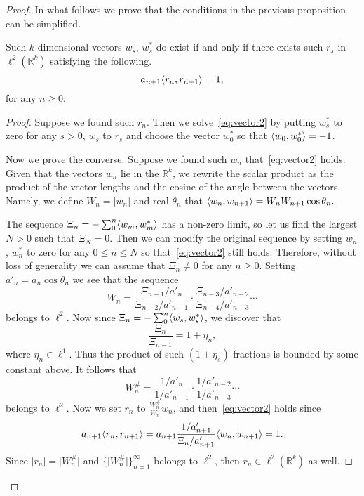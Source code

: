 \begin{proof}
    In what follows we prove that the conditions in the previous proposition can be simplified.
    \begin{prop}
      \label{prop:reformulation-lw}
      Such $k$-dimensional vectors $w_s$, $w^*_s$ do exist if and only if there exists such $r_s$ in $\ell^2(\mathbb{R}^k)$
        satisfying the following.
      \begin{equation}
        \label{eq:vector3}
        a_{n+1} \langle r_n, r_{n+1} \rangle = 1,
      \end{equation}
      for any $n \geq 0$.
    \end{prop}
    \begin{proof}
      Suppose we found such $r_n$.
      Then we solve~\eqref{eq:vector2} by putting $w^*_s$ to zero for any $s > 0$, $w_s$ to $r_s$ and
        choose the vector $w^*_0$ so that $\langle w_0, w^*_0 \rangle = -1$.

      Now we prove the converse.
      Suppose we found such $w_n$ that~\eqref{eq:vector2} holds.
      Given that the vectors $w_n$ lie in the $\mathbb{R}^k$, we rewrite the scalar product as
        the product of the vector lengths and the cosine of the angle between the vectors.
      Namely, we define $W_n = \lvert w_n\rvert$ and real $\theta_n$ that
        $\langle w_{n}, w_{n+1} \rangle = W_n W_{n+1} \cos{\theta_n}.$

      The sequence $\Xi_n = -\sum_0^n \langle w_m, w^*_m \rangle$ has a non-zero limit, so let us
        find the largest $N > 0$ such that $\Xi_N = 0$.
      Then we can modify the original sequence by setting $w_n$, $w^*_n$ to zero for any $0 \leq n \leq N$ so that~\eqref{eq:vector2}
        still holds.
      Therefore, without loss of generality we can assume that $\Xi_n \neq 0$ for any $n \geq 0$.
      Setting $a'_n = a_n \cos{\theta_n}$ we see that the sequence
      \[
        W_n = \frac{\Xi_{n-1}/a'_n}{\Xi_{n-2}/a'_{n-1}} \cdot \frac{\Xi_{n-3}/a'_{n-2}}{\Xi_{n-4}/a'_{n-3}} \cdots
      \]
        belongs to $\ell^2$.
      Now since $\Xi_n = -\sum_0^n \langle w_s, w^*_s \rangle$, we discover that
      \[
        \frac{\Xi_n}{\Xi_{n-1}} = 1 + \eta_n,
      \]
        where $\eta_n \in \ell^1$.
      Thus the product of such $(1 + \eta_s)$ fractions is bounded by some constant above.
      It follows that
      \[
        W^\#_n = \frac{1/a'_n}{1/a'_{n-1}} \cdot \frac{1/a'_{n-2}}{1/a'_{n-3}} \cdots
      \]
        belongs to $\ell^2$.
      Now we set $r_n$ to $\frac{W^\#_n}{W_n}w_n$, and then~\eqref{eq:vector2} holds since
      \[
        a_{n+1} \langle r_n, r_{n+1} \rangle = a_{n+1} \frac{1/a'_{n+1}}{\Xi_n/a'_{n+1}} \langle w_n, w_{n+1} \rangle = 1.
      \]
      Since $\lvert r_n \rvert = \lvert W^\#_n \rvert$ and $\{\lvert W^\#_n \rvert\}_{n=1}^\infty$ belongs to $\ell^2$,
        then $r_n \in \ell^2(\mathbb{R}^k)$ as well.
    \end{proof}


\end{proof}
